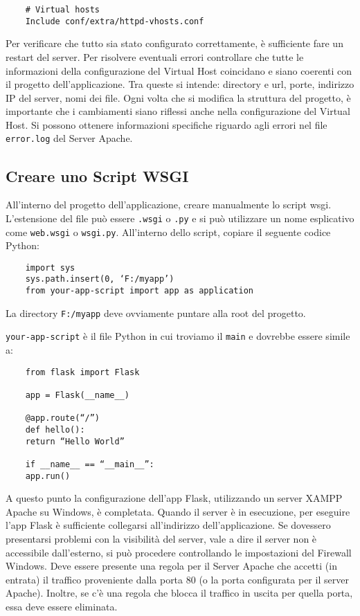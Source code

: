 \begin{verbatim}
    # Virtual hosts
    Include conf/extra/httpd-vhosts.conf
\end{verbatim}
Per verificare che tutto sia stato configurato correttamente, è sufficiente fare un restart del server. Per risolvere eventuali errori controllare che tutte le informazioni della configurazione del Virtual Host coincidano e siano coerenti con il progetto dell'applicazione. Tra queste si intende: directory e url, porte, indirizzo IP del server, nomi dei file. Ogni volta che si modifica la struttura del progetto, è importante che i cambiamenti siano riflessi anche nella configurazione del Virtual Host. Si possono ottenere informazioni specifiche riguardo agli errori nel file \verb|error.log| del Server Apache.

\subsection*{Creare uno Script WSGI}

All'interno del progetto dell'applicazione, creare manualmente lo script wsgi. L’estensione del file può essere \verb|.wsgi| o \verb|.py| e si può utilizzare un nome esplicativo come \verb|web.wsgi| o \verb|wsgi.py|. All'interno dello script, copiare il seguente codice Python:

\begin{verbatim}
    import sys
    sys.path.insert(0, ‘F:/myapp’)
    from your-app-script import app as application
\end{verbatim}

La directory \verb|F:/myapp| deve ovviamente puntare alla root del progetto.

\verb|your-app-script| è il file Python in cui troviamo il \verb|main| e dovrebbe essere simile a:

\begin{verbatim}
    from flask import Flask

    app = Flask(__name__)

    @app.route(“/”)
    def hello():
    return “Hello World”

    if __name__ == “__main__”:
    app.run()
\end{verbatim}
A questo punto la configurazione dell'app Flask, utilizzando un server XAMPP Apache su Windows, è completata. 
\newline
Quando il server è in esecuzione, per eseguire l’app Flask è sufficiente collegarsi all'indirizzo dell'applicazione.
\newline
Se dovessero presentarsi problemi con la visibilità del server, vale a dire il server non è accessibile dall'esterno, si può procedere controllando le impostazioni del Firewall Windows. Deve essere presente una regola per il Server Apache che accetti (in entrata) il traffico proveniente dalla porta 80 (o la porta configurata per il server Apache). Inoltre, se c’è una regola che blocca il traffico in uscita per quella porta, essa deve essere eliminata.